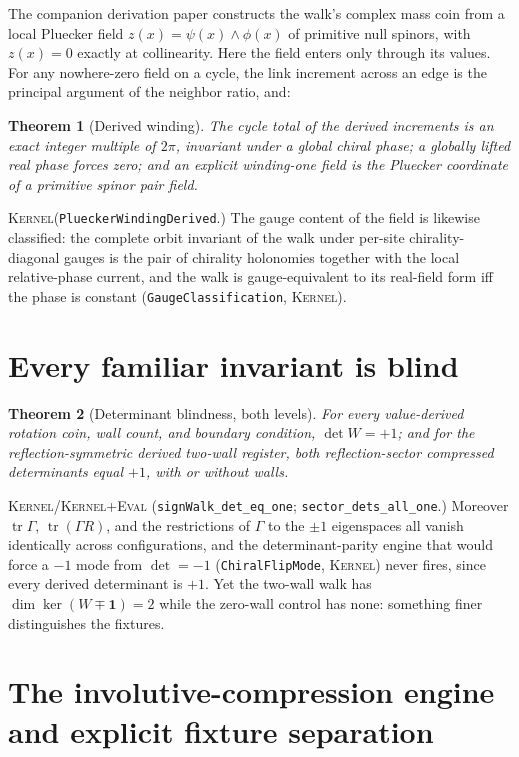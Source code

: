 \documentclass[11pt]{article}
\newcommand{\id}{\mathbf{1}}
\newcommand{\tr}{\operatorname{tr}}
\newcommand{\Kernel}{\textcolor{kernelcolor}{\textsc{Kernel}}}
\newcommand{\DraftTrust}{\textcolor{draftcolor}{\textsc{Kernel+Eval}}}
\newtheorem{theorem}{Theorem}
\begin{document}
The companion derivation paper \cite{CompanionDerivation} constructs the
walk's complex mass coin from a local Pluecker field
$z(x)=\psi(x)\wedge\phi(x)$ of primitive null spinors, with $z(x)=0$
exactly at collinearity.  Here the field enters only through its values.
For any nowhere-zero field on a cycle, the link increment across an edge is
the principal argument of the neighbor ratio, and:

\begin{theorem}[Derived winding]\label{thm:winding}
The cycle total of the derived increments is an exact integer multiple of
$2\pi$, invariant under a global chiral phase; a globally lifted real phase
forces zero; and an explicit winding-one field is the Pluecker coordinate
of a primitive spinor pair field.
\end{theorem}
\noindent\Kernel{}\quad(\texttt{PlueckerWindingDerived}.)  The gauge
content of the field is likewise classified: the complete orbit invariant
of the walk under per-site chirality-diagonal gauges is the pair of
chirality holonomies together with the local relative-phase current, and
the walk is gauge-equivalent to its real-field form iff the phase is
constant \cite{CompanionDerivation} (\texttt{GaugeClassification},
\Kernel{}).

\section{Every familiar invariant is blind}

\begin{theorem}[Determinant blindness, both levels]\label{thm:blind}
For every value-derived rotation coin, wall count, and boundary condition,
$\det W=+1$; and for the reflection-symmetric derived two-wall register,
both reflection-sector compressed determinants equal $+1$, with or without
walls.
\end{theorem}
\noindent\Kernel{}/\DraftTrust{}\quad
(\texttt{signWalk\_det\_eq\_one}; \texttt{sector\_dets\_all\_one}.)
Moreover $\tr\Gamma$, $\tr(\Gamma R)$, and the restrictions of $\Gamma$ to
the $\pm1$ eigenspaces all vanish identically across configurations, and
the determinant-parity engine that would force a $-1$ mode from
$\det=-1$ (\texttt{ChiralFlipMode}, \Kernel{}) never fires, since every
derived determinant is $+1$.  Yet
the two-wall walk has $\dim\ker(W\mp\id)=2$ while the zero-wall control has
none: something finer distinguishes the fixtures.

\section{The involutive-compression engine and explicit fixture separation}
\end{document}
